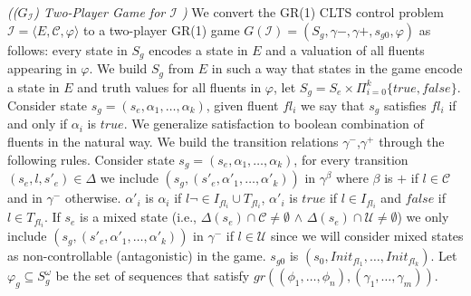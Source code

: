 \begin{definition}\label{def:lts-2-game}\emph{(($G_{\mathcal{I}}$) Two-Player Game for $\mathcal{I}$ )}
We convert the GR(1) CLTS control problem $\mathcal{I}=\langle E, \mathcal{C}, \varphi \rangle$ to a two-player GR(1) game $G (\mathcal{I})=(S_{g},\gamma{-},\gamma{+},s_{g0},\varphi)$ as follows: every state in $S_{g}$ encodes a state in $E$ and a valuation of all fluents
appearing in $\varphi$. We build $S_g$ from $E$ in such a way that states in the game encode a state in $E$ and truth values for all fluents in $\varphi$, let $S_g = S_e \times \Pi_{i=0}^{k}\{true,false\}$.  Consider state $s_g=(s_e,\alpha_1,\ldots,\alpha_k)$, given fluent $fl_i$ we say that $s_g$ satisfies $fl_i$ if and only if $\alpha_i$ is $true$. We generalize satisfaction to boolean combination of fluents in the natural way.  We build the transition relations $\gamma^{-}$,$\gamma^{+}$ through the following rules.  Consider state $s_g=(s_e,\alpha_1,\ldots,\alpha_k)$, for every transition $(s_e,l,s'_e) \in \Delta$ we include $(s_g,(s'_e,\alpha'_1,\ldots,\alpha'_k))$ in $\gamma^{\beta}$ where
$\beta$ is $+$ if $l \in \mathcal{C}$ and in $\gamma^{-}$ otherwise.
$\alpha'_i$ is $\alpha_i$ if $l \neg\in I_{fl_i} \cup T_{fl_i}$, $\alpha'_i$ is $true$ if $l \in I_{fl_i}$ and $false$ if $l \in T_{fl_i}$.  
If $s_e$ is a mixed state (i.e., $\Delta(s_e) \cap \mathcal{C} \neq \emptyset$
$\wedge$
$\Delta(s_e) \cap \mathcal{U} \neq \emptyset$) we only include
$(s_g, (s'_e,\alpha'_1,\ldots,\alpha'_k))$ in $\gamma^{-}$
if $l \in \mathcal{U}$ since we will consider mixed states as 
non-controllable (antagonistic) in the game.
$s_{g0}$ is $(s_0, Init_{fl_1},\ldots, Init_{fl_k})$.
Let $\varphi_g \subseteq S_g^{\omega}$ be the set of sequences that satisfy $gr((\phi_1,\ldots,\phi_n),(\gamma_1,\ldots,\gamma_m))$.
\end{definition}



